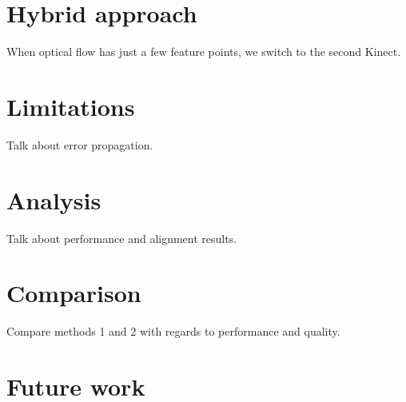 \documentclass[msc, a4paper, classic, en]{ufbathesis}
\begin{document}
\section{Hybrid approach}
When optical flow has just a few feature points, we switch to the second Kinect.

\section{Limitations}
Talk about error propagation.
\section{Analysis}
Talk about performance and alignment results.
\section{Comparison}
Compare methods 1 and 2 with regards to performance and quality.

\section{Future work}

\backmatter

\appendix

% 
% 
% 





\end{document}
